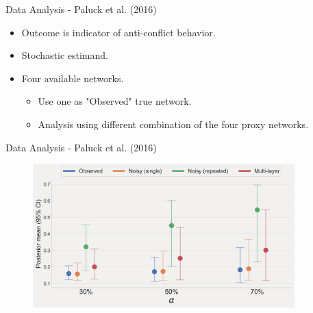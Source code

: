 \documentclass{beamer}
\begin{document}
    \begin{frame}{Data Analysis - Paluck et al. (2016)}
        \large
        \begin{itemize}
            \item Outcome is indicator of anti-conflict behavior. 
            \vspace{0.2cm}
            \item Stochastic estimand.
            \vspace{0.2cm}
            \item Four available networks. 
            \begin{itemize}
                \normalsize
                \item Use one as "Observed" true network.
                \vspace{0.05cm}
                \item Analysis using different combination of the four proxy networks.
            \end{itemize}
            
        \end{itemize}
    \end{frame}

    \begin{frame}[noframenumbering]{Data Analysis - Paluck et al. (2016)}
        \begin{figure}[hbtp]
            \centering
            \includegraphics[width=0.9\textwidth]{figs/paluck_results.png}
        \end{figure}
    \end{frame}
\end{document}
